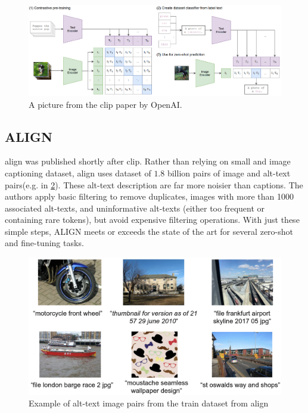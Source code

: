         \begin{figure}
            \centering
            \includegraphics[width=\textwidth]{Images/crossmodalnetworks/OpenAICLIP.png}
            \caption{A picture from the \acrshort{clip} paper by OpenAI.}
            \label{fig:crossmodalnetworks:openaiclip}
        \end{figure}

        \subsection{ALIGN
            \label{section:align}}
        \acrfull{align}\cite{ALIGN} was published shortly after \acrshort{clip}.
        Rather than relying on small and image captioning dataset, \acrshort{align} uses dataset of \(1.8\) billion pairs of image and alt-text pairs(e.g. in \cref{fig:crossmodalnetworks:alignepairs}).
        These alt-text description are far more noisier than captions.
        The authors apply basic filtering to remove duplicates, images with more than 1000 associated alt-texts, and uninformative alt-texts (either too frequent or containing rare tokens), but avoid expensive filtering operations.
        With just these simple steps, ALIGN meets or exceeds the state of the art for several zero-shot and fine-tuning tasks.
        \begin{figure}
            \centering
            \includegraphics[width=\textwidth]{Images/crossmodalnetworks/examplepicsalign.png}
            \caption{Example of alt-text image pairs from the train dataset from \acrshort{align}}
            \label{fig:crossmodalnetworks:alignepairs}
        \end{figure}

